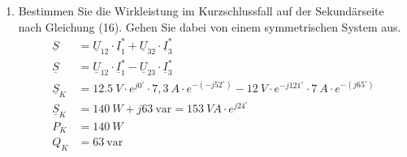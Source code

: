 \begin{enumerate}[label=\alph*)]
	\item Bestimmen Sie die Wirkleistung im Kurzschlussfall auf der Sekundärseite nach
	      Gleichung (16). Gehen Sie dabei von einem symmetrischen System aus.
	      \begin{align*}
		      \underline S   & = \underline U_{12} \cdot \underline I_1^* + \underline U_{32}\cdot \underline I_3^* \\
		      \underline S   & = \underline U_{12} \cdot \underline I_1^* - \underline U_{23}\cdot \underline I_3^* \\
		      \underline S_K & = 12.5\ V \cdot e^{j0^\circ} \cdot 7,3\ A \cdot e^{-(-j52^\circ)}
		      - 12\ V \cdot e^{-j121^\circ}\cdot 7\ A \cdot e^{-(j65^\circ)}                                        \\
		      \underline S_K & = 140\ W+j 63\ \text{var} = 153\ VA \cdot e^{j24^\circ}                              \\
		      P_K            & = 140\ W                                                                             \\
		      Q_K            & = 63\ \text{var}
	      \end{align*}


\end{enumerate}
